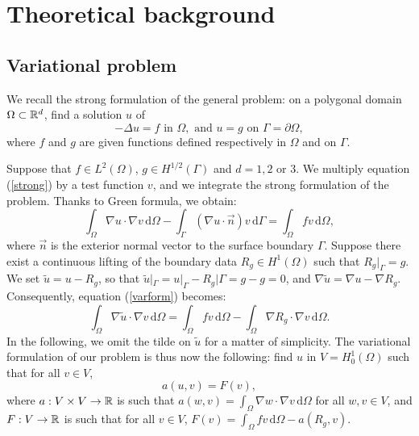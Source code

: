 \newpage
\section{Theoretical background}\label{theory}

\subsection{Variational problem}
We recall the strong formulation of the general problem: on a polygonal domain $\Omega \subset \mathbb{R}^d$, find a solution $u$ of 
\begin{equation}\label{strong}
-\Delta u = f \text{ in } \Omega, \text{ and } u = g \text{ on } \Gamma = \partial \Omega,
\end{equation}
where $f$ and $g$ are given functions defined respectively in $\Omega$ and on $\Gamma$. 

Suppose that $f\in L^2(\Omega)$, $g\in H^{1/2}(\Gamma)$ and $d=1,2$ or $3$. We multiply equation (\ref{strong}) by a test function $v$, and we integrate the strong formulation of the problem. Thanks to Green formula, we obtain:
\begin{equation}\label{varform} \int_\Omega \nabla u\cdot \nabla v \, \mathrm{d}\Omega- \int_\Gamma (\nabla u \cdot \vec{n}) v \, \mathrm{d}\Gamma = \int_\Omega fv \, \mathrm{d}\Omega, 
\end{equation}
where $\vec{n}$ is the exterior normal vector to the surface boundary $\Gamma$. Suppose there exist a continuous lifting of the boundary data $R_g \in H^1(\Omega)$ such that  $R_g|_{\Gamma} = g$. We set $\tilde{u} = u - R_g$, so that $\tilde{u}|_\Gamma = u|_\Gamma - R_g|\Gamma = g-g = 0$, and $\nabla \tilde{u} = \nabla u - \nabla R_g$. Consequently, equation (\ref{varform}) becomes: 
\begin{equation*}
\int_\Omega \nabla \tilde{u}\cdot \nabla v \, \mathrm{d}\Omega = \int_\Omega fv \, \mathrm{d}\Omega -	 \int_\Omega \nabla R_g \cdot \nabla v \, \mathrm{d}\Omega.
\end{equation*}
In the following, we omit the tilde on $\tilde{u}$ for a matter of simplicity. The variational formulation of our problem is thus now the following: find $u$ in $V=H^1_0(\Omega)$ such that for all $v\in V$, 
\begin{equation}\label{weak}
a(u,v) = F(v),
\end{equation}
where $a : V \times V \rightarrow \mathbb{R}$ is such that $a(w,v) = \int_\Omega \nabla w\cdot \nabla v \, \mathrm{d}\Omega$ for all $w,v\in V$, and $F:V\rightarrow\mathbb{R}$ is such that for all $v\in V$, $F(v) = \int_\Omega fv \, \mathrm{d}\Omega - a(R_g, v)$.

